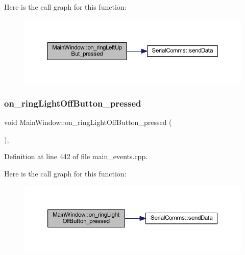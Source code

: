 Here is the call graph for this function\+:
\nopagebreak
\begin{figure}[H]
\begin{center}
\leavevmode
\includegraphics[width=350pt]{class_main_window_aefd08ff26ec69cb1a8c2da298e414742_cgraph}
\end{center}
\end{figure}
\mbox{\label{class_main_window_ac5c8ca012c0b479ca3b42a172df11f99}} 
\subsubsection{\texorpdfstring{on\_ringLightOffButton\_pressed}{on\_ringLightOffButton\_pressed}}
{\footnotesize\ttfamily void Main\+Window\+::on\+\_\+ring\+Light\+Off\+Button\+\_\+pressed (\begin{DoxyParamCaption}{ }\end{DoxyParamCaption})\hspace{0.3cm}{\ttfamily [private]}, {\ttfamily [slot]}}



Definition at line 442 of file main\+\_\+events.\+cpp.

Here is the call graph for this function\+:
\nopagebreak
\begin{figure}[H]
\begin{center}
\leavevmode
\includegraphics[width=350pt]{class_main_window_ac5c8ca012c0b479ca3b42a172df11f99_cgraph}
\end{center}
\end{figure}
\mbox{\label{class_main_window_ac7c8a9d8f85ea41b9017fb13c95c3e79}} 
